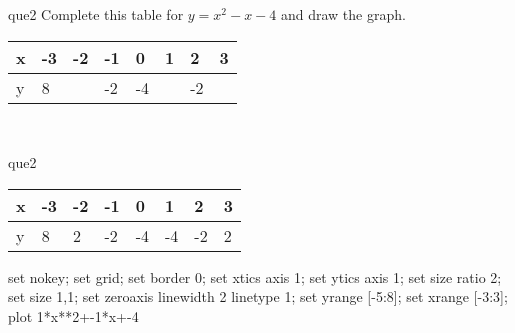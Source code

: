 \documentclass[13.5pt, varwidth=true]{beamer}
\begin{document}
\begin{frame}[shrink=19,fragile]
	\begin{beamercolorbox}[rounded=true, left, shadow=true,wd=14.8cm]{que2}
		 Complete this table for $y = x^{2} - x - 4$ and draw the graph. \\[0.3cm] \renewcommand{\arraystretch}{1.2}\begin{tabular}{|C|C|C|C|C|C|C|C|} \hline x & -3 & -2 & -1 & 0 & 1 & 2 & 3 \\ \hline y & 8 &  & -2 & -4 &  & -2 & \\ \hline \end{tabular}\\[0.3cm]
	\end{beamercolorbox}
\end{frame}
\begin{frame}[shrink=19,fragile]
	\begin{beamercolorbox}[rounded=true, left, shadow=true,wd=14.8cm]{que2}
		\renewcommand{\arraystretch}{1.2}\begin{tabular}{|C|C|C|C|C|C|C|C|} \hline x & -3 & -2 & -1 & 0 & 1 & 2 & 3 \\ \hline y & 8 & 2 & -2 & -4 & -4 & -2 & 2\\ \hline \end{tabular}\begin{gnuplot}[terminal=pdf] set nokey; set grid; set border 0; set xtics axis 1; set ytics axis 1; set size ratio 2; set size 1,1; set zeroaxis linewidth 2 linetype 1; set yrange [-5:8]; set xrange [-3:3]; plot 1*x**2+-1*x+-4 \end{gnuplot}
	\end{beamercolorbox}
\end{frame}
\end{document}
